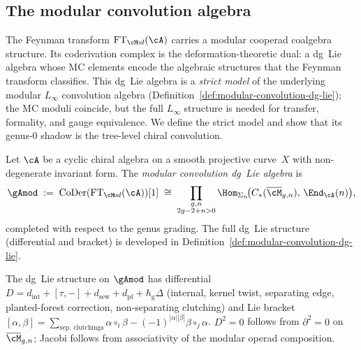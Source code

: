 \subsection{The modular convolution algebra}
\label{subsec:modular-convolution}

The Feynman transform $\mathrm{FT}_{\cM\!od}(\cA)$ carries a
modular cooperad coalgebra structure. Its coderivation complex is
the deformation-theoretic dual: a dg~Lie algebra whose MC elements
encode the algebraic structures that the Feynman transform
classifies. This dg~Lie algebra is a \emph{strict model} of the
underlying modular $L_\infty$ convolution algebra
(Definition~\ref{def:modular-convolution-dg-lie}); the MC moduli
coincide, but the full $L_\infty$ structure is needed for transfer,
formality, and gauge equivalence. We define the strict model and
show that its genus-$0$ shadow is the tree-level chiral
convolution.

\begin{definition}
\label{def:modular-convolution-vol1}
Let $\cA$ be a cyclic chiral algebra on a smooth projective
curve~$X$ with non-degenerate invariant form. The \emph{modular
convolution dg~Lie algebra} is
\begin{equation}\label{eq:modular-convolution-vol1}
\gAmod
\;:=\;
\operatorname{CoDer}(\mathrm{FT}_{\cM\!od}(\cA))[1]
\;\cong\;
\prod_{\substack{g,n \\ 2g-2+n > 0}}
\Hom_{\Sigma_n}\!\bigl(
C_*(\overline{\cM}_{g,n}),\,
\End_\cA(n)
\bigr),
\end{equation}
completed with respect to the genus grading.
The full dg~Lie structure (differential and bracket) is developed
in Definition~\ref{def:modular-convolution-dg-lie}.
\end{definition}

\begin{theorem}
\label{thm:modular-convolution-structure}
The dg~Lie structure on $\gAmod$ has differential
$D = d_{\mathrm{int}} + [\tau,-] + d_{\mathrm{sew}}
+ d_{\mathrm{pf}} + \hbar_{\mathrm{g}}\Delta$
\textup{(}internal, kernel twist, separating edge, planted-forest
correction, non-separating clutching\textup{)} and Lie bracket
$[\alpha,\beta] = \sum_{\text{sep.\ clutchings}}
\alpha \circ_i \beta
- (-1)^{|\alpha||\beta|} \beta \circ_j \alpha$.
$D^2 = 0$ follows from $\partial^2 = 0$ on
$\overline{\cM}_{g,n}$; Jacobi follows from associativity
of the modular operad composition.
\end{theorem}

